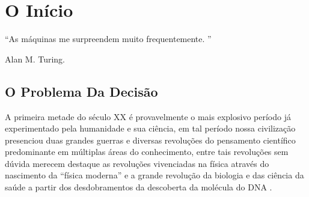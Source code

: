 \chapter{O Início}\label{cap:InicioComputabilidadeDecidibildiade}


\epigraph{``As máquinas me surpreendem muito frequentemente. ''}{Alan M. Turing.}


% 

\section{O Problema Da Decisão}\label{sec:ProblemaDecisao}

A primeira metade do século XX é provavelmente o mais explosivo período já experimentado pela humanidade e sua ciência, em tal período nossa civilização presenciou duas grandes guerras e diversas revoluções do pensamento científico predominante em múltiplas áreas do conhecimento, entre tais revoluções sem dúvida merecem destaque as revoluções vivenciadas na física através do nascimento da ``física moderna'' \cite{bohr1937, dirac1981, einstein1905a, einstein1912b, einstein2005, schrodinger1926, einstein1905b} e a grande revolução da biologia e das ciência da saúde a partir dos desdobramentos da descoberta da molécula do DNA \cite{watson1953}.

